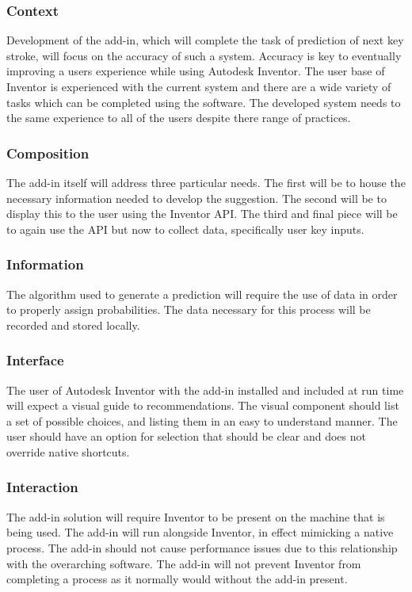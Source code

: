 \documentclass[onecolumn, draftclsnofoot,10pt, compsoc]{IEEEtran}
\begin{document}
\subsubsection{Context}
Development of the add-in, which will complete the task of prediction of next key stroke, will focus on the accuracy of such a system. Accuracy is key to eventually improving a users experience while using Autodesk Inventor. The user base of Inventor is experienced with the current system and there are a wide variety of tasks which can be completed using the software. The developed system needs to the same experience to all of the users despite there range of practices. 
\subsubsection{Composition}
The add-in itself will address three particular needs. The first will be to house the necessary information needed to develop the suggestion. The second will be to display this to the user using the Inventor API. The third and final piece will be to again use the API but now to collect data, specifically user key inputs.  
\subsubsection{Information}
The algorithm used to generate a prediction will require the use of data in order to properly assign probabilities. The data necessary for this process will be recorded and stored locally. 
\subsubsection{Interface}
The user of Autodesk Inventor with the add-in installed and included at run time will expect a visual guide to recommendations. The visual component should list a set of possible choices, and listing them in an easy to understand manner. The user should have an option for selection that should be clear and does not override native shortcuts. 
\subsubsection{Interaction}
The add-in solution will require Inventor to be present on the machine that is being used. The add-in will run alongside Inventor, in effect mimicking a native process. The add-in should not cause performance issues due to this relationship with the overarching software. The add-in will not prevent Inventor from completing a process as it normally would without the add-in present.  
\end{document}

